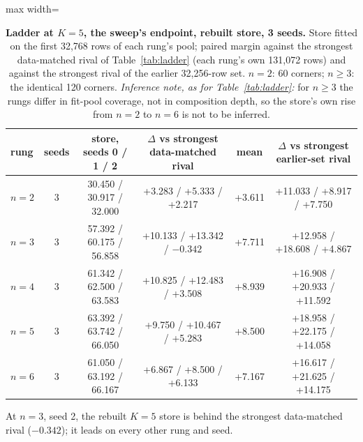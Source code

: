 \documentclass{article} %
\begin{document}
\begin{table}[h]
\centering\small
\caption{\textbf{Ladder at $K=5$, the sweep's endpoint, rebuilt store, 3 seeds.} Store fitted on the %
first 32,768 rows of each rung's pool; paired margin against the strongest data-matched rival of %
Table~\ref{tab:ladder} (each rung's own 131,072 rows) and against the strongest rival of the earlier %
32,256-row set. $n=2$: 60 corners; $n\ge3$: the identical 120 corners. \emph{Inference note, as for %
Table~\ref{tab:ladder}:} for $n\ge3$ the rungs differ in fit-pool coverage, not in composition
depth, so the store's own rise from $n=2$ to $n=6$ is not to be inferred.}
\label{tab:k5}
\setlength{\tabcolsep}{2.4pt}
\begin{adjustbox}{max width=\linewidth}\begin{tabular}{lccccc}
\toprule
rung & seeds & store, seeds 0 / 1 / 2 & $\Delta$ vs strongest data-matched rival & mean & $\Delta$ vs strongest earlier-set rival \\
\midrule
$n=2$ & 3 & 30.450 / 30.917 / 32.000 & +3.283 / +5.333 / +2.217 & +3.611 & +11.033 / +8.917 / +7.750 \\
$n=3$ & 3 & 57.392 / 60.175 / 56.858 & +10.133 / +13.342 / $-0.342$ & +7.711 & +12.958 / +18.608 / +4.867 \\
$n=4$ & 3 & 61.342 / 62.500 / 63.583 & +10.825 / +12.483 / +3.508 & +8.939 & +16.908 / +20.933 / +11.592 \\
$n=5$ & 3 & 63.392 / 63.742 / 66.050 & +9.750 / +10.467 / +5.283 & +8.500 & +18.958 / +22.175 / +14.058 \\
$n=6$ & 3 & 61.050 / 63.192 / 66.167 & +6.867 / +8.500 / +6.133 & +7.167 & +16.617 / +21.625 / +14.175 \\
\bottomrule
\end{tabular}\end{adjustbox}
\end{table}

\noindent At $n=3$, seed 2, the rebuilt $K=5$ store is behind the strongest data-matched rival %
($-0.342$); it leads on every other rung and seed.
\end{document}
